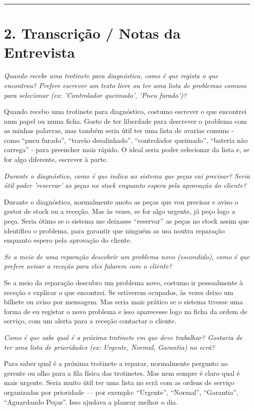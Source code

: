 \documentclass[11pt,a4paper]{article}
\newcommand{\pergunta}[1]{\item[P:] \textit{#1}}
\newcommand{\resposta}[1]{\item[R:] #1}
\begin{document}
	\hrule %
	\vspace{0.5cm}
	
	\section*{2. Transcrição / Notas da Entrevista}
	
	\begin{transcription}
		
		\pergunta{Quando recebe uma trotinete para diagnóstico, como é que regista o que encontrou? Prefere escrever um texto livre ou ter uma lista de problemas comuns para selecionar (ex: 'Controlador queimado', 'Pneu furado')?}
		\resposta{Quando recebo uma trotinete para diagnóstico, costumo escrever o que encontrei num papel ou numa ficha. Gosto de ter liberdade para descrever o problema com as minhas palavras, mas também seria útil ter uma lista de avarias comuns - como “pneu furado”, “travão desalinhado”, “controlador queimado”, “bateria não carrega” - para preencher mais rápido. O ideal seria poder selecionar da lista e, se for algo diferente, escrever à parte.}
		
		\pergunta{Durante o diagnóstico, como é que indica ao sistema que peças vai precisar? Seria útil poder 'reservar' as peças no stock enquanto espera pela aprovação do cliente?}
		\resposta{Durante o diagnóstico, normalmente anoto as peças que vou precisar e aviso o gestor de stock ou a receção. Mas às vezes, se for algo urgente, já peço logo a peça. Seria ótimo se o sistema me deixasse “reservar” as peças no stock assim que identifico o problema, para garantir que ninguém as usa noutra reparação enquanto espero pela aprovação do cliente.}
		
		\pergunta{Se a meio de uma reparação descobrir um problema novo (escondido), como é que prefere avisar a receção para eles falarem com o cliente?}
		\resposta{Se a meio da reparação descubro um problema novo, costumo ir pessoalmente à receção e explicar o que encontrei. Se estiverem ocupados, às vezes deixo um bilhete ou aviso por mensagem. Mas seria mais prático se o sistema tivesse uma forma de eu registar o novo problema e isso aparecesse logo na ficha da ordem de serviço, com um alerta para a receção contactar o cliente.}
		
		\pergunta{Como é que sabe qual é a próxima trotinete em que deve trabalhar? Gostaria de ter uma lista de prioridades (ex: Urgente, Normal, Garantia) no ecrã?}
		\resposta{Para saber qual é a próxima trotinete a reparar, normalmente pergunto ao gerente ou olho para a fila física das trotinetes. Mas nem sempre é claro qual é mais urgente. Seria muito útil ter uma lista no ecrã com as ordens de serviço organizadas por prioridade — por exemplo: “Urgente”, “Normal”, “Garantia”, “Aguardando Peças”. Isso ajudava a planear melhor o dia.}
		

\end{transcription}
\end{document}

